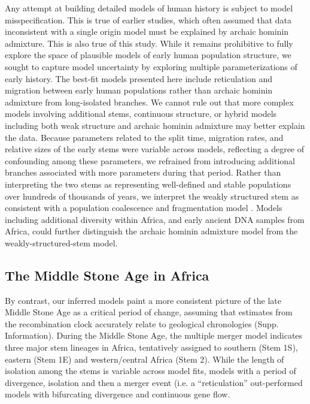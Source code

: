 \documentclass[]{article}
\begin{document}
Any attempt at building detailed models of human history is subject to model
misspecification. This is true of earlier studies, which often assumed that
data inconsistent with a single origin model must be explained by archaic
hominin admixture. This is also true of this study. While it remains prohibitive to
fully explore the space of plausible models of early human population structure,
we sought to capture model uncertainty by exploring multiple parameterizations of
early history.
The best-fit models presented here include reticulation and migration between
early human populations rather than archaic hominin admixture from long-isolated branches.
We cannot rule out that more complex models involving
additional stems, continuous structure, or hybrid models including both weak structure and archaic
hominin admixture may better explain the data. Because parameters related to the split
time, migration rates, and relative sizes of the early stems were variable
across models, reflecting a degree of confounding among these parameters, we
refrained from introducing additional branches associated with more
parameters during that period.
Rather than interpreting the two stems as representing well-defined
and stable populations over hundreds of thousands of years, we interpret the
weakly structured stem as consistent with a population coalescence and
fragmentation model \citep{Scerri2019-xg}.
Models including additional diversity within Africa,
and early ancient DNA samples from Africa, could further distinguish
the archaic hominin admixture model from the weakly-structured-stem model.

\subsection*{The Middle Stone Age in Africa}

By contrast, our inferred models paint a more consistent picture of the late
Middle Stone Age as a critical period of change, assuming that estimates from
the recombination clock accurately relate to geological chronologies
(Supp. Information).
During the Middle Stone Age, the multiple merger model indicates three
major stem lineages in Africa, tentatively assigned to southern (Stem 1S),
eastern (Stem 1E) and western/central Africa (Stem 2). While the length of
isolation among the stems is variable across model fits, models with a period of 
divergence, isolation and then a merger event (i.e. a ``reticulation''
out-performed models with bifurcating divergence and continuous gene flow. 
\end{document}
